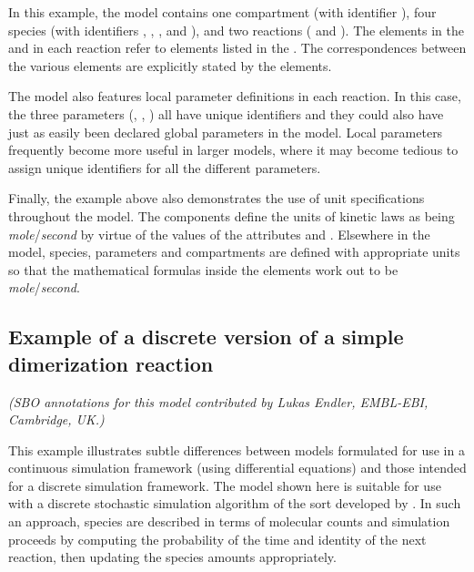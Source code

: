 
In this example, the model contains one compartment (with
identifier ), four species (with identifiers
, , , and ), and two reactions
( and ).  The elements in the
 and  in each
reaction refer to elements listed in the .
The correspondences between the various elements are explicitly
stated by the  elements.

The model also features local parameter definitions in each
reaction.  In this case, the three parameters (,
, ) all have unique identifiers and they could
also have just as easily been declared global parameters in the
model.  Local parameters frequently become more useful in larger
models, where it may become tedious to assign unique identifiers
for all the different parameters.

Finally, the example above also demonstrates the use of unit
specifications throughout the model.  The  components
define the units of kinetic laws as being
\emph{mole}/\emph{second} by virtue of the values of the
attributes  and .  Elsewhere
in the model, species, parameters and compartments are defined
with appropriate units so that the mathematical formulas inside
the  elements work out to be
\emph{mole}/\emph{second}.   


\subsection{Example of a discrete version of a simple dimerization reaction}
\label{sec:discrete-eg}

\emph{(SBO annotations for this model contributed by Lukas Endler,
  EMBL-EBI, Cambridge, UK.)}

This example illustrates subtle differences between models
formulated for use in a continuous simulation framework (\eg using
differential equations) and those intended for a discrete
simulation framework.  The model shown here is suitable for use
with a discrete stochastic simulation algorithm of the sort
developed by \cite{gillespie:1977}.  In such an approach, species
are described in terms of molecular counts and simulation
proceeds by computing the probability of the time and identity of
the next reaction, then updating the species amounts
appropriately.

